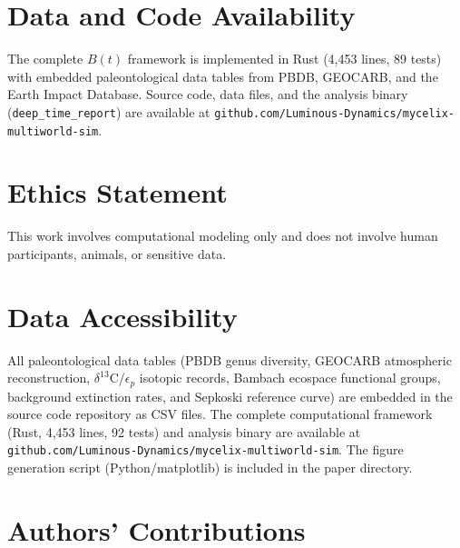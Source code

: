 \documentclass[10pt,letterpaper]{article}
\newcommand{\bt}{$B(t)$}
\begin{document}
\section*{Data and Code Availability}

The complete \bt{} framework is implemented in Rust (4,453 lines, 89 tests)
with embedded paleontological data tables from PBDB, GEOCARB, and the Earth
Impact Database. Source code, data files, and the analysis binary
(\texttt{deep\_time\_report}) are available at
\texttt{github.com/Luminous-Dynamics/mycelix-multiworld-sim}.

\section*{Ethics Statement}

This work involves computational modeling only and does not involve human
participants, animals, or sensitive data.

\section*{Data Accessibility}

All paleontological data tables (PBDB genus diversity, GEOCARB atmospheric
reconstruction, $\delta^{13}$C/$\epsilon_p$ isotopic records, Bambach
ecospace functional groups, background extinction rates, and Sepkoski
reference curve) are embedded in the source code repository as CSV files.
The complete computational framework (Rust, 4,453 lines, 92 tests) and
analysis binary are available at
\texttt{github.com/Luminous-Dynamics/mycelix-multiworld-sim}.
The figure generation script (Python/matplotlib) is included in the
paper directory.

\section*{Authors' Contributions}
\end{document}
